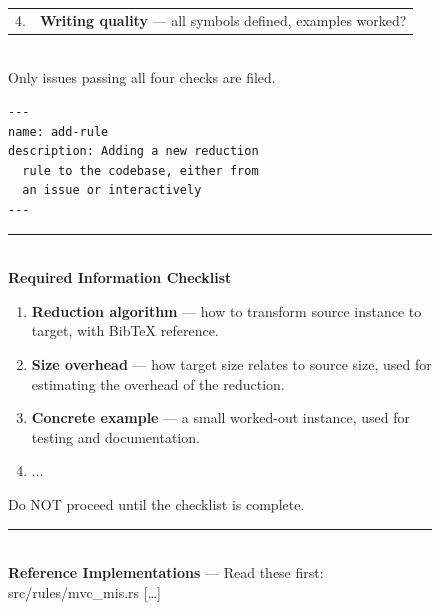 \documentclass{article}
\begin{document}
\begin{figure}[htbp]
\begin{minipage}[t]{0.525\textwidth}
\begin{tcolorbox}
\begin{tabular}{@{}r@{~}l@{}}
    4. & \textbf{Writing quality} --- all symbols defined, examples worked? \\
  \end{tabular}\\[2pt]
  Only issues passing all four checks are filed.
  \end{tcolorbox}
  \label{fig:skill-propose}
  \end{minipage}\hspace{4pt}%
  \begin{minipage}[t]{0.445\textwidth}
  \begin{tcolorbox}[
    colback=gray!5, colframe=gray!80,
    title={\textbf{\texttt{add-rule}} --- automation skill (excerpts)},
    fonttitle=\footnotesize, boxrule=0.4pt, arc=2pt, left=4pt, right=4pt, top=2pt, bottom=2pt,
    equal height group=skillbox,
  ]
  \footnotesize
  \begin{lstlisting}[basicstyle=\ttfamily\scriptsize, numbers=none, frame=none, aboveskip=0pt, belowskip=0pt, xleftmargin=4pt]
---
name: add-rule
description: Adding a new reduction 
  rule to the codebase, either from 
  an issue or interactively
---
  \end{lstlisting}
  \vspace{-4pt}
  \rule{\linewidth}{0.3pt}\\[3pt]
  \textbf{Required Information Checklist}
  \begingroup
  \setlength{\leftmargini}{1.4em}
  \setlength{\itemsep}{1pt}
  \setlength{\parskip}{0pt}
  \begin{enumerate}
    \item \textbf{Reduction algorithm} --- how to transform source instance to target, with BibTeX reference.
    \item \textbf{Size overhead} --- how target size relates to source size, used for estimating the overhead of the reduction.
    \item \textbf{Concrete example} --- a small worked-out instance, used for testing and documentation.
    \item $\ldots$
  \end{enumerate}
  \endgroup
  Do NOT proceed until the checklist is complete.\\[3pt]
  \rule{\linewidth}{0.3pt}\\[3pt]
  \textbf{Reference Implementations} --- Read these first:\\
  {\ttfamily src/rules/mvc\_mis.rs} [\ldots{}]\\[3pt]

\end{tcolorbox}
\end{minipage}
\end{figure}
\end{document}
